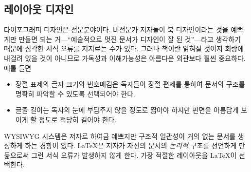 \subsection{레이아웃 디자인}

타이포그래피 디자인은 전문분야이다. 비전문가 저자들이 북 디자인이라는 것을 예쁘게만 만들면
되는 거---``예술적으로 멋진 문서가 디자인이 잘 된 것''---라고 생각하기 때문에
심각한 서식 오류를 저지르는 수가 있다. 그러나 책이란 읽혀질 것이지 회랑에 내걸려 있을 것이 
아니므로 가독성과 이해가능성은 아름다운 외관보다 훨씬 중요하다.
예를 들면
\begin{itemize} \firmlist
  \item 장절 표제의 글자 크기와 번호매김은 독자들이 장절 편제를 통하여 문서의 구조를 명확히 파악할 수 있도록 선택되어야 한다.
  \item 글줄 길이는 독자의 눈에 부담주지 않을 정도로 짧아야 하지만 판면을 아름답게 보이게 할 정도로 적당히 길어야 한다.
\end{itemize}

WYSIWYG 시스템은 저자로 하여금 예쁘지만 구조적 일관성이 거의 없는 문서를 생성하게 하는 경향이 있다.
\LaTeX 은 저자가 자신의 문서의 \emph{논리적} 구조를 선언하게 만듦으로써 그런 서식 오류가 발생하지 않게 한다.
가장 적절한 레이아웃을 \LaTeX 이 선택한다.

